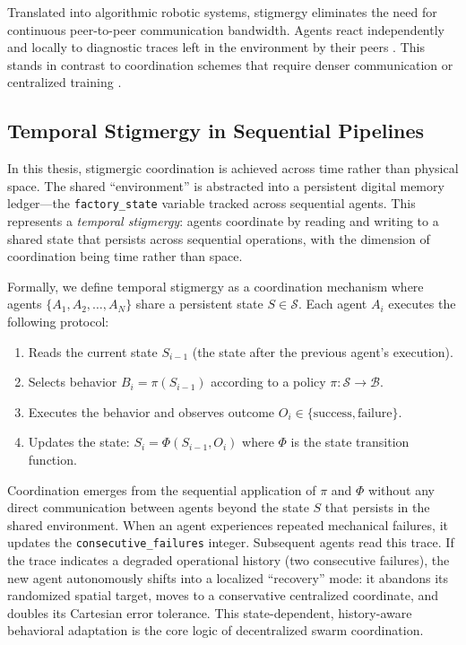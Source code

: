 \documentclass[12pt,a4paper,oneside]{report}
\begin{document}
Translated into algorithmic robotic systems, stigmergy eliminates the need for continuous peer-to-peer communication bandwidth. Agents react independently and locally to diagnostic traces left in the environment by their peers \cite{bongard2006resilient}. This stands in contrast to coordination schemes that require denser communication or centralized training \cite{domberg2026selfadapting, daneshmand2026slowrl}.

\subsection{Temporal Stigmergy in Sequential Pipelines}
In this thesis, stigmergic coordination is achieved across time rather than physical space. The shared ``environment'' is abstracted into a persistent digital memory ledger---the \texttt{factory\_state} variable tracked across sequential agents. This represents a \textit{temporal stigmergy}: agents coordinate by reading and writing to a shared state that persists across sequential operations, with the dimension of coordination being time rather than space.

Formally, we define temporal stigmergy as a coordination mechanism where agents $\{A_1, A_2, \ldots, A_N\}$ share a persistent state $S \in \mathcal{S}$. Each agent $A_i$ executes the following protocol:
\begin{enumerate}
    \item Reads the current state $S_{i-1}$ (the state after the previous agent's execution).
    \item Selects behavior $B_i = \pi(S_{i-1})$ according to a policy $\pi: \mathcal{S} \rightarrow \mathcal{B}$.
    \item Executes the behavior and observes outcome $O_i \in \{\text{success}, \text{failure}\}$.
    \item Updates the state: $S_i = \Phi(S_{i-1}, O_i)$ where $\Phi$ is the state transition function.
\end{enumerate}

Coordination emerges from the sequential application of $\pi$ and $\Phi$ without any direct communication between agents beyond the state $S$ that persists in the shared environment. When an agent experiences repeated mechanical failures, it updates the \texttt{consecutive\_failures} integer. Subsequent agents read this trace. If the trace indicates a degraded operational history (two consecutive failures), the new agent autonomously shifts into a localized ``recovery'' mode: it abandons its randomized spatial target, moves to a conservative centralized coordinate, and doubles its Cartesian error tolerance. This state-dependent, history-aware behavioral adaptation is the core logic of decentralized swarm coordination.
\end{document}
